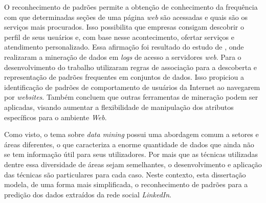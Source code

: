 O reconhecimento de padrões permite a obtenção de conhecimento da frequência com que determinadas seções de uma página \textit{web} são acessadas e quais são os serviços mais procurados. Isso possibilita que empresas consigam descobrir o perfil de seus usuários e, com base nesse acontecimento, ofertar serviços e atendimento personalizado. Essa afirmação foi resultado do estudo de , onde realizaram a mineração de dados em \textit{logs} de acesso a servidores \textit{web}. Para o desenvolvimento do trabalho utilizaram regras de associação para a descoberta e representação de padrões frequentes em conjuntos de dados. Isso propiciou a identificação de padrões de comportamento de usuários da Internet ao navegarem por \textit{websites}. Também concluem que outras ferramentas de mineração podem ser aplicadas, visando aumentar a flexibilidade de manipulação dos atributos específicos para o ambiente \textit{Web}.

Como visto, o tema sobre \textit{data mining} possui uma abordagem comum a setores e áreas diferentes, o que caracteriza a enorme quantidade de dados que ainda não se tem informação útil para seus utilizadores. Por mais que as técnicas utilizadas dentre essa diversidade de áreas sejam semelhantes, o desenvolvimento e aplicação das técnicas são particulares para cada caso. Neste contexto, esta dissertação modela, de uma forma mais simplificada, o reconhecimento de padrões para a predição dos dados extraídos da rede social \textit{LinkedIn}.












